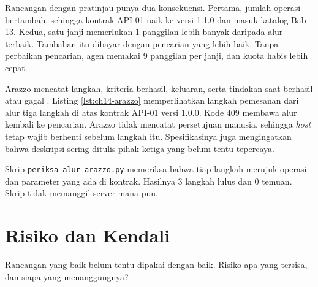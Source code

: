 Rancangan dengan pratinjau punya dua konsekuensi. Pertama, jumlah operasi bertambah, sehingga kontrak API-01 naik ke versi 1.1.0 dan masuk katalog Bab 13. Kedua, satu janji memerlukan
1 panggilan lebih banyak daripada alur terbaik. Tambahan itu dibayar dengan pencarian yang lebih baik. Tanpa perbaikan pencarian, agen memakai 9 panggilan per janji, dan kuota habis
lebih cepat.

\begin{pendalaman}[title={Pendalaman Teknis (opsional): Alur Pemesanan dengan Arazzo}]
Arazzo mencatat langkah, kriteria berhasil, keluaran, serta tindakan saat berhasil atau gagal \cite{c14-arazzo}. Listing \ref{lst:ch14-arazzo} memperlihatkan langkah pemesanan dari alur tiga langkah
di atas kontrak API-01 versi 1.0.0. Kode 409 membawa alur kembali ke pencarian. Arazzo tidak mencatat persetujuan manusia, sehingga \textit{host} tetap wajib berhenti sebelum langkah itu.
Spesifikasinya juga mengingatkan bahwa deskripsi sering ditulis pihak ketiga yang belum tentu tepercaya.

Skrip \texttt{periksa-alur-arazzo.py} memeriksa bahwa tiap langkah merujuk operasi dan parameter yang ada di kontrak. Hasilnya 3 langkah lulus dan 0 temuan. Skrip tidak memanggil server mana pun.


\end{pendalaman}

\section{Risiko dan Kendali}

Rancangan yang baik belum tentu dipakai dengan baik. Risiko apa yang tersisa, dan siapa yang menanggungnya?

